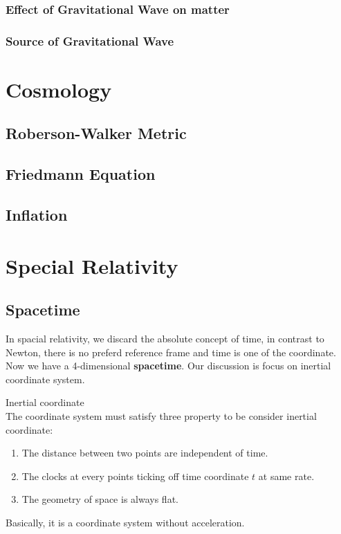 \documentclass[12pt]{article}
\theoremstyle{mystyle}{\newtheorem{definition}{Definition}[section]}
\theoremstyle{mystyle}{\newtheorem{theorem}[definition]{Theorem}}
\theoremstyle{mystyle}{\newtheorem*{remark}{Remark}}
\theoremstyle{mystyle}{\newtheorem*{example}{Example}}
\theoremstyle{mystyle}{\newtheorem*{examples}{Examples}}
\theoremstyle{cstyle}{\newtheorem*{cthm}{}}
\begin{document}
\subsubsection{Effect of Gravitational Wave on matter}
\subsubsection{Source of Gravitational Wave}

\section{Cosmology}
\subsection{Roberson-Walker Metric}
\subsection{Friedmann Equation}
\subsection{Inflation}

\newpage
\appendix
{}

\section{Special Relativity}


\subsection{Spacetime}
In spacial relativity, we discard the absolute concept of time, in contrast to Newton, there is no preferd reference frame
and time is one of the coordinate.
Now we have a 4-dimensional \textbf{spacetime}. Our discussion is focus on inertial coordinate system.
\begin{definition}
  Inertial coordinate \\
  The coordinate system must satisfy three property to be consider inertial coordinate:
  \begin{enumerate}
    \item The distance between two points are independent of time.
    \item The clocks at every points ticking off time coordinate $t$ at same rate.
    \item The geometry of space is always flat.
  \end{enumerate}
  Basically, it is a coordinate system without acceleration.
\end{definition}
\end{document}

